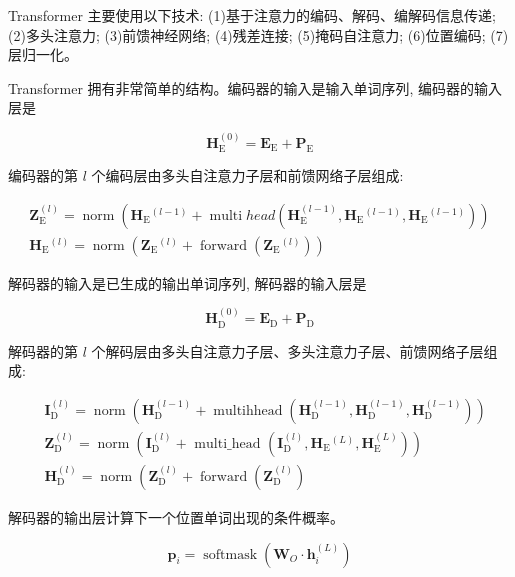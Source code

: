 \documentclass[10pt]{article}
\begin{document}
Transformer 主要使用以下技术: (1)基于注意力的编码、解码、编解码信息传递; (2)多头注意力; (3)前馈神经网络; (4)残差连接; (5)掩码自注意力; (6)位置编码; (7)层归一化。

Transformer 拥有非常简单的结构。编码器的输入是输入单词序列, 编码器的输入层是

$$
\boldsymbol{H}_{\mathrm{E}}^{(0)}=\boldsymbol{E}_{\mathrm{E}}+\boldsymbol{P}_{\mathrm{E}}
$$

编码器的第 $l$ 个编码层由多头自注意力子层和前馈网络子层组成:

$$
\begin{gathered}
\boldsymbol{Z}_{\mathrm{E}}^{(l)}=\operatorname{norm}\left(\boldsymbol{H}_{\mathrm{E}}{ }^{(l-1)}+\operatorname{multi} h e a d\left(\boldsymbol{H}_{\mathrm{E}}^{(l-1)}, \boldsymbol{H}_{\mathrm{E}}{ }^{(l-1)}, \boldsymbol{H}_{\mathrm{E}}{ }^{(l-1)}\right)\right) \\
\boldsymbol{H}_{\mathrm{E}}{ }^{(l)}=\operatorname{norm}\left(\boldsymbol{Z}_{\mathrm{E}}{ }^{(l)}+\operatorname{forward}\left(\boldsymbol{Z}_{\mathrm{E}}{ }^{(l)}\right)\right)
\end{gathered}
$$

解码器的输入是已生成的输出单词序列, 解码器的输入层是

$$
\boldsymbol{H}_{\mathrm{D}}^{(0)}=\boldsymbol{E}_{\mathrm{D}}+\boldsymbol{P}_{\mathrm{D}}
$$

解码器的第 $l$ 个解码层由多头自注意力子层、多头注意力子层、前馈网络子层组成:

$$
\begin{aligned}
& \boldsymbol{I}_{\mathrm{D}}^{(l)}=\operatorname{norm}\left(\boldsymbol{H}_{\mathrm{D}}^{(l-1)}+\operatorname{multihhead}\left(\boldsymbol{H}_{\mathrm{D}}^{(l-1)}, \boldsymbol{H}_{\mathrm{D}}^{(l-1)}, \boldsymbol{H}_{\mathrm{D}}^{(l-1)}\right)\right) \\
& \boldsymbol{Z}_{\mathrm{D}}^{(l)}=\operatorname{norm}\left(\boldsymbol{I}_{\mathrm{D}}^{(l)}+\text { multi_head }\left(\boldsymbol{I}_{\mathrm{D}}^{(l)}, \boldsymbol{H}_{\mathrm{E}}{ }^{(L)}, \boldsymbol{H}_{\mathrm{E}}^{(L)}\right)\right) \\
& \boldsymbol{H}_{\mathrm{D}}^{(l)}=\operatorname{norm}\left(\boldsymbol{Z}_{\mathrm{D}}^{(l)}+\operatorname{forward}\left(\boldsymbol{Z}_{\mathrm{D}}^{(l)}\right)\right.
\end{aligned}
$$

解码器的输出层计算下一个位置单词出现的条件概率。

$$
\boldsymbol{p}_{i}=\operatorname{softmask}\left(\boldsymbol{W}_{O} \cdot \boldsymbol{h}_{i}^{(L)}\right)
$$
\end{document}
